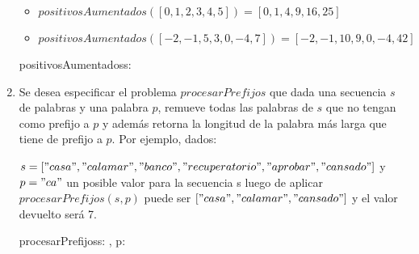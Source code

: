 \begin{enumerate}[label=\alph*)]
            \begin{itemize}
                  \item $positivosAumentados([0,1,2,3,4,5]) = [0,1,4,9,16,25]$
                  \item $positivosAumentados([-2,-1,5,3,0,-4,7]) = [-2,-1,10,9,0,-4,42]$
            \end{itemize}

            \begin{proc}{positivosAumentados}{\In s: \TLista{\ent}}{\TLista{\ent}}

            \end{proc}

      \item Se desea especificar el problema $procesarPrefijos$ que dada una secuencia $s$ de palabras y una palabra $p$, remueve todas las palabras de $s$ que no tengan como prefijo a $p$ y además retorna la longitud de la palabra más larga que tiene de prefijo a $p$. Por ejemplo, dados:

            $s = ["casa", "calamar", "banco", "recuperatorio", "aprobar", "cansado"]$ y $p = "ca"$ un posible valor para la secuencia s luego de aplicar $procesarPrefijos(s, p)$ puede ser $["casa", "calamar", "cansado"]$ y el valor devuelto será 7.

            \begin{proc}{procesarPrefijos}{\Inout s: \TLista{\str}, \In p: \str}{\ent}

            \end{proc}
\end{enumerate}


